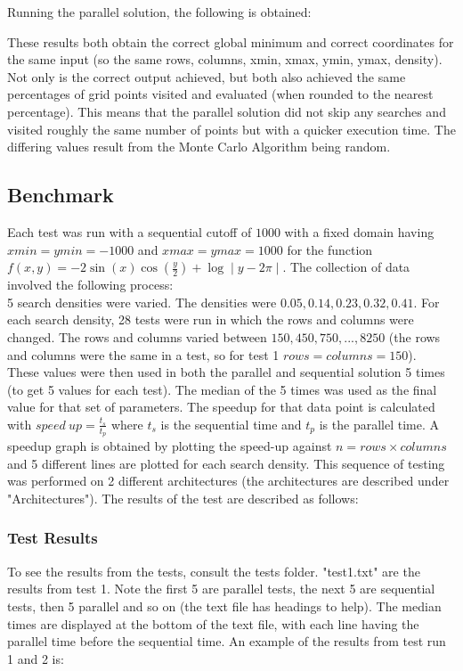 \documentclass{assignment}
\begin{document}
Running the parallel solution, the following is obtained:
\begin{center}
     
\end{center}
These results both obtain the correct global minimum and correct coordinates for the same input (so the same rows, columns, xmin, xmax, ymin, ymax, density). Not only is the correct output achieved, but both also achieved the same percentages of grid points visited and evaluated (when rounded to the nearest percentage). This means that the parallel solution did not skip any searches and visited roughly the same number of points but with a quicker execution time. The differing values result from the Monte Carlo Algorithm being random. 

\subsection{Benchmark}
Each test was run with a sequential cutoff of $1000$ with a fixed domain having $xmin = ymin = -1000$ and $xmax = ymax = 1000$ for the function $f(x,y)=-2 \sin (x) \cos (\frac{y}{2})+\log \mid y-2 \pi \mid$. The collection of data involved the following process:
\\ 5 search densities were varied. The densities were $0.05, 0.14, 0.23, 0.32, 0.41$. For each search density, 28 tests were run in which the rows and columns were changed. The rows and columns varied between $150, 450, 750, ..., 8250$ (the rows and columns were the same in a test, so for test 1 $rows = columns = 150$). \\ These values were then used in both the parallel and sequential solution 5 times (to get 5 values for each test). The median of the 5 times was used as the final value for that set of parameters. The speedup for that data point is calculated with $speed \ up = \frac{t_s}{t_p}$ where $t_s$ is the sequential time and $t_p$ is the parallel time. A speedup graph is obtained by plotting the speed-up against $n=rows \times columns$ and 5 different lines are plotted for each search density. This sequence of testing was performed on 2 different architectures (the architectures are described under "Architectures"). The results of the test are described as follows:
\subsubsection{Test Results}
To see the results from the tests, consult the tests folder. "test1.txt" are the results from test 1. Note the first 5 are parallel tests, the next 5 are sequential tests, then 5 parallel and so on (the text file has headings to help). The median times are displayed at the bottom of the text file, with each line having the parallel time before the sequential time. An example of the results from test run 1 and 2 is:
\\
\end{document}
